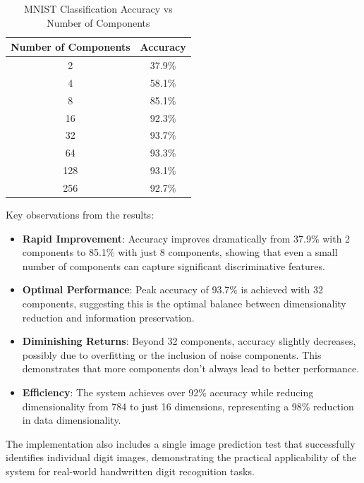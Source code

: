 \documentclass[11pt,a4paper]{article}
\begin{document}
\begin{table}[h]
    \centering
    \begin{tabular}{|c|c|}
        \hline
        Number of Components & Accuracy \\
        \hline
        2 & 37.9\% \\
        4 & 58.1\% \\
        8 & 85.1\% \\
        16 & 92.3\% \\
        32 & 93.7\% \\
        64 & 93.3\% \\
        128 & 93.1\% \\
        256 & 92.7\% \\
        \hline
    \end{tabular}
    \caption{MNIST Classification Accuracy vs Number of Components}
    \label{tab:mnist_accuracy}
\end{table}

Key observations from the results:

\begin{itemize}
    \item \textbf{Rapid Improvement}: Accuracy improves dramatically from 37.9\% with 2 components to 85.1\% with just 8 components, showing that even a small number of components can capture significant discriminative features.
    
    \item \textbf{Optimal Performance}: Peak accuracy of 93.7\% is achieved with 32 components, suggesting this is the optimal balance between dimensionality reduction and information preservation.
    
    \item \textbf{Diminishing Returns}: Beyond 32 components, accuracy slightly decreases, possibly due to overfitting or the inclusion of noise components. This demonstrates that more components don't always lead to better performance.
    
    \item \textbf{Efficiency}: The system achieves over 92\% accuracy while reducing dimensionality from 784 to just 16 dimensions, representing a 98\% reduction in data dimensionality.
\end{itemize}

The implementation also includes a single image prediction test that successfully identifies individual digit images, demonstrating the practical applicability of the system for real-world handwritten digit recognition tasks.
\end{document}
